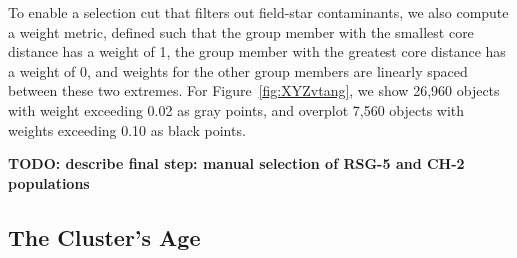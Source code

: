 \documentclass[12pt,twocolumn,linenumbers]{aastex63}
\begin{document}
To enable a selection cut that filters out field-star contaminants, we
also compute a weight metric, defined such that the group member
with the smallest core distance has a weight of 1, the group member
with the greatest core distance has a weight of 0, and weights for the
other group members are linearly spaced between these two extremes.
For Figure~\ref{fig:XYZvtang}, we show 26{,}960 objects with weight
exceeding 0.02 as gray points, and overplot 7{,}560 objects with
weights exceeding 0.10 as black points.

{\bf TODO: describe final step: manual selection of RSG-5 and CH-2 populations}


%
%



\subsection{The Cluster's Age}
\label{sec:clusterage}
\end{document}
